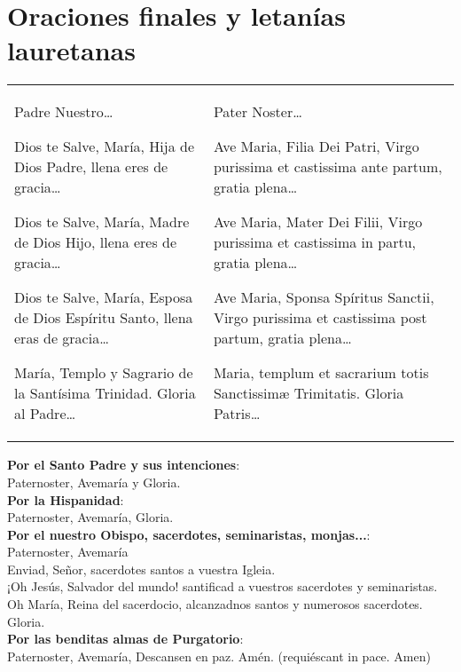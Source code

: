 \documentclass[./rosary.tex]{subfiles}
\begin{document}
\section*{Oraciones finales y letanías lauretanas}
\label{sec:final-prayer}

\begin{longtable} { p{} p{} }
    Padre Nuestro{\ldots}

    Dios te Salve, María, Hija de Dios Padre, llena eres de gracia{\ldots}

    Dios te Salve, María, Madre de Dios Hijo, llena eres de gracia{\ldots}

    Dios te Salve, María, Esposa de Dios Espíritu Santo, llena eras de gracia{\ldots}

    María, Templo y Sagrario de la Santísima Trinidad. Gloria al Padre{\ldots}

     &

    Pater Noster{\ldots}

    Ave Maria, Filia Dei Patri, Virgo purissima et castissima ante partum, gratia plena{\ldots}

    Ave Maria, Mater Dei Filii, Virgo purissima et castissima in partu, gratia plena{\ldots}

    Ave Maria, Sponsa Spíritus Sanctii, Virgo purissima et castissima post partum, gratia plena{\ldots}

    Maria, templum et sacrarium totis Sanctissimæ Trimitatis. Gloria Patris{\ldots}
\end{longtable}

\noindent\textbf{Por el Santo Padre y sus intenciones}:\\
{\indent}Paternoster, Avemaría y Gloria.\\
\noindent\textbf{Por la Hispanidad}:\\ 
{\indent}Paternoster, Avemaría, Gloria.\\
\noindent\textbf{Por el nuestro Obispo, sacerdotes, seminaristas, monjas...}:\\ 
{\indent}Paternoster, Avemaría\\
{\indent}Enviad, Señor, sacerdotes santos a vuestra Igleia.\\
{\indent}¡Oh Jesús, Salvador del mundo! santificad a vuestros sacerdotes y seminaristas.\\
{\indent}Oh María, Reina del sacerdocio, alcanzadnos santos y numerosos sacerdotes.\\
{\indent}Gloria.\\
\noindent\textbf{Por las benditas almas de Purgatorio}:\\
{\indent}Paternoster, Avemaría, Descansen en paz. Amén. (requiéscant in pace. Amen)
\end{document}
